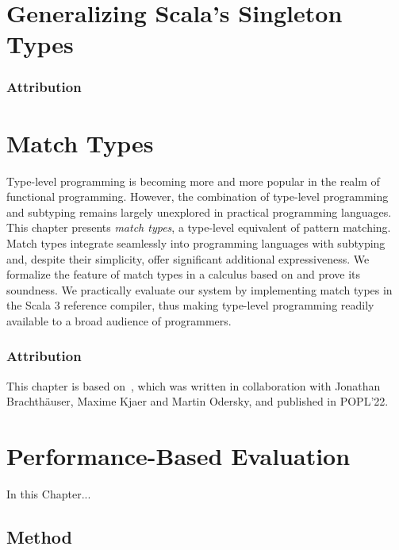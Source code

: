 \chapter{Generalizing Scala's Singleton Types}
\label{chap:generalizing-scala-s-singleton-types}
\subsection*{Attribution}
\citep{schmid2020coming}


\chapter{Match Types}
\label{chap:match-types}

Type-level programming is becoming more and more popular in the realm of functional programming.
However, the combination of type-level programming and subtyping remains largely unexplored in practical programming languages.
This chapter presents \emph{match types}, a type-level equivalent of pattern matching.
Match types integrate seamlessly into programming languages with subtyping and, despite their simplicity, offer significant additional expressiveness.
We formalize the feature of match types in a calculus based on \SystemFsub and prove its soundness.
We practically evaluate our system by implementing match types in the Scala 3 reference compiler, thus making type-level programming readily available to a broad audience of programmers.

\subsection*{Attribution}

This chapter is based on~\citep{blanvillain2022type}, which was written in collaboration with Jonathan Brachthäuser, Maxime Kjaer and Martin Odersky, and published in POPL'22.



\chapter{Performance-Based Evaluation}
\label{chap:performance-based-evaluation}

In this Chapter...

\section{Method}

